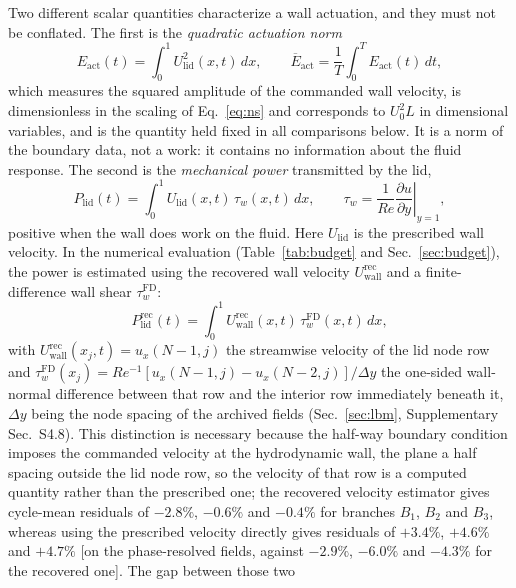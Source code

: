 \documentclass[11pt,a4paper]{article}
\newcommand{\Eact}{E_{\mathrm{act}}}
\newcommand{\Plid}{P_{\mathrm{lid}}}
\newenvironment{chgadd}{\par\color{blue}}{\par\color{black}}
\begin{document}
\begin{chgadd}
Two different scalar quantities characterize a wall actuation, and they must not
be conflated. The first is the \emph{quadratic actuation norm}
\begin{equation}
\Eact(t)=\int_0^1 U_{\mathrm{lid}}^2(x,t)\,dx,
\qquad
\overline{E}_{\mathrm{act}}=\frac{1}{T}\int_0^T\Eact(t)\,dt,
\label{eq:eact}
\end{equation}
which measures the squared amplitude of the commanded wall velocity, is
dimensionless in the scaling of Eq.~\eqref{eq:ns} and corresponds to $U_0^2L$ in
dimensional variables, and is the quantity held fixed in all comparisons below.
It is a norm of
the boundary data, not a work: it contains no information about the fluid response.
The second is the \emph{mechanical power} transmitted by the lid,
\begin{equation}
\Plid(t)=\int_0^1 U_{\mathrm{lid}}(x,t)\,\tau_w(x,t)\,dx,
\qquad
\tau_w=\frac{1}{Re}\left.\frac{\partial u}{\partial y}\right|_{y=1},
\label{eq:plid}
\end{equation}
positive when the wall does work on the fluid. Here $U_{\mathrm{lid}}$ is the
prescribed wall velocity. In the numerical evaluation (Table~\ref{tab:budget}
and Sec.~\ref{sec:budget}), the power is estimated using the recovered wall
velocity $U_{\mathrm{wall}}^{\mathrm{rec}}$ and a finite-difference wall shear
$\tau_w^{\mathrm{FD}}$:
\begin{equation}
\Plid^{\mathrm{rec}}(t)=\int_0^1 U_{\mathrm{wall}}^{\mathrm{rec}}(x,t)\,\tau_w^{\mathrm{FD}}(x,t)\,dx,
\label{eq:plid_rec}
\end{equation}
with $U_{\mathrm{wall}}^{\mathrm{rec}}(x_j,t)=u_x(N-1,j)$ the streamwise velocity of
the lid node row and
$\tau_w^{\mathrm{FD}}(x_j)=Re^{-1}[u_x(N-1,j)-u_x(N-2,j)]/\Delta y$ the one-sided
wall-normal difference between that row and the interior row immediately beneath it,
$\Delta y$ being the node spacing of the archived fields (Sec.~\ref{sec:lbm},
Supplementary Sec.~S4.8).
This distinction is necessary because the half-way boundary condition imposes the
commanded velocity at the hydrodynamic wall, the plane a half spacing outside the lid
node row, so the velocity of that row is a computed quantity rather than the
prescribed one; the recovered velocity estimator
gives cycle-mean residuals of $-2.8\%$, $-0.6\%$ and $-0.4\%$ for branches $B_1$,
$B_2$ and $B_3$, whereas using the prescribed velocity directly gives residuals of
$+3.4\%$, $+4.6\%$ and $+4.7\%$ [on the phase-resolved fields, against
$-2.9\%$, $-6.0\%$ and $-4.3\%$ for the recovered one]. The gap between those two

\end{chgadd}
\end{document}
